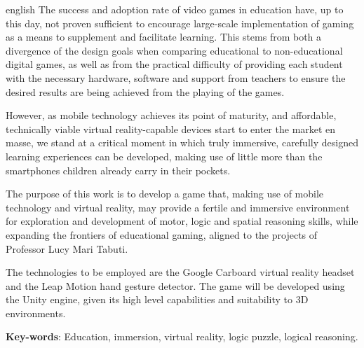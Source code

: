 \begin{resumo}[Abstract]
 \begin{otherlanguage*}{english}
   The success and adoption rate of video games in education have, up to this day, not proven sufficient to encourage large-scale implementation of gaming as a means to supplement and facilitate learning. This stems from both a divergence of the design goals when comparing educational to non-educational digital games, as well as from the practical difficulty of providing each student with the necessary hardware, software and support from teachers to ensure the desired results are being achieved from the playing of the games.
   
   However, as mobile technology achieves its point of maturity, and affordable, technically viable virtual reality-capable devices start to enter the market en masse, we stand at a critical moment in which truly immersive, carefully designed learning experiences can be developed, making use of little more than the smartphones children already carry in their pockets.
   
   The purpose of this work is to develop a game that, making use of mobile technology and virtual reality, may provide a fertile and immersive environment for exploration and development of motor, logic and spatial reasoning skills, while expanding the frontiers of educational gaming, aligned to the projects of Professor Lucy Mari Tabuti.
   
   The technologies to be employed are the Google Carboard virtual reality headset and the Leap Motion hand gesture detector. The game will be developed using the Unity engine, given its high level capabilities and suitability to 3D environments.

    \vspace{\onelineskip}

    \noindent
    \textbf{Key-words}: Education, immersion, virtual reality, logic puzzle, logical reasoning.
  \end{otherlanguage*}
\end{resumo}